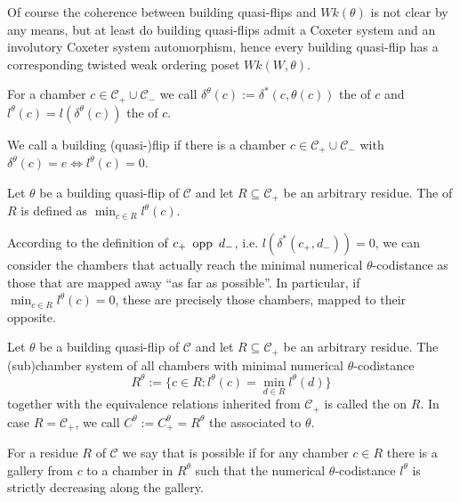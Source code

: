 Of course the coherence between building quasi-flips and $Wk(\theta)$ is not clear by any means, but at least do building quasi-flips admit a Coxeter system and an involutory Coxeter system automorphism, hence every building quasi-flip has a corresponding twisted weak ordering poset $Wk(W,\theta)$.

\begin{defi}
	For a chamber $c \in \mathcal C_+ \cup \mathcal C_-$ we call $\delta^\theta(c) := \delta^*(c,\theta(c))$ the  of $c$ and $l^\theta(c) = l(\delta^\theta(c))$ the  of $c$.
\end{defi}

\begin{defi}
	We call a building (quasi-)flip  if there is a chamber $c \in \mathcal{C}_+ \cup \mathcal{C}_-$ with $\delta^{\theta}(c) = e \iff l^{\theta}(c) = 0$.
\end{defi}

\begin{defi}
	Let $\theta$ be a building quasi-flip of $\mathcal C$ and let $R \subseteq \mathcal C_+$ be an arbitrary residue. The  of $R$ is defined as $\min_{c \in R} l^{\theta}(c)$.
\end{defi}

According to the definition of $c_+ \opp d_-$, i.e. $l(\delta^*(c_+,d_-)) = 0$, we can consider the chambers that actually reach the minimal numerical $\theta$-codistance as those that are mapped away ``as far as possible''. In particular, if $\min_{c \in R} l^{\theta}(c) = 0$, these are precisely those chambers, mapped to their opposite.

\begin{defi}
	Let $\theta$ be a building quasi-flip of $\mathcal C$ and let $R \subseteq \mathcal C_+$ be an arbitrary residue. The (sub)chamber system of all chambers with minimal numerical $\theta$-codistance
	$$ R^\theta := \{ c \in R : l^\theta(c) = \min_{d \in R} l^\theta(d) \} $$
	together with the equivalence relations inherited from $\mathcal C_+$ is called the  on $R$. In case $R = \mathcal C_+$, we call $C^\theta := C_+^\theta = R^\theta$ the  associated to $\theta$.
\end{defi}

\begin{defi}
	For a residue $R$ of $\mathcal{C}$ we say that  is possible if for any chamber $c \in R$ there is a gallery from $c$ to a chamber in $R^\theta$ such that the numerical $\theta$-codistance $l^\theta$ is strictly decreasing along the gallery.
\end{defi}

